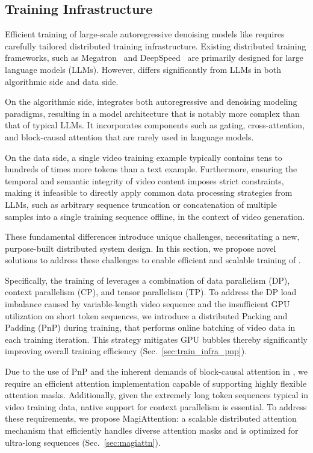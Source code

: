\subsection{Training Infrastructure}




Efficient training of large-scale autoregressive denoising models like \magi requires carefully tailored distributed training infrastructure. Existing distributed training frameworks, such as Megatron~\citep{shoeybi2020megatronlm} and DeepSpeed~\citep{rajbhandari2020zeromemoryoptimizationstraining} are primarily designed for large language models (LLMs). However, \magi differs significantly from LLMs in both algorithmic side and data side.

On the algorithmic side, \magi integrates both autoregressive and denoising modeling paradigms, resulting in a model architecture that is notably more complex than that of typical LLMs. It incorporates components such as gating, cross-attention, and block-causal attention that are rarely used in language models.


On the data side, a single video training example typically contains tens to hundreds of times more tokens than a text example. Furthermore, ensuring the temporal and semantic integrity of video content imposes strict constraints, making it infeasible to directly apply common data processing strategies from LLMs, such as arbitrary sequence truncation or concatenation of multiple samples into a single training sequence offline, in the context of video generation.

These fundamental differences introduce unique challenges, necessitating a new, purpose-built distributed system design. In this section, we propose novel solutions to address these challenges to enable efficient and scalable training of \magi. 


Specifically, the training of \magi leverages a combination of data parallelism (DP), context parallelism (CP), and tensor parallelism (TP). To address the DP load imbalance caused by variable-length video sequence and the insufficient GPU utilization on short token sequences, we introduce a distributed Packing and Padding (PnP) during training, that performs online batching of video data in each training iteration. This strategy mitigates GPU bubbles thereby significantly improving overall training efficiency (Sec.~\ref{sec:train_infra_pnp}).

Due to the use of PnP and the inherent demands of block-causal attention in \magi, we require an efficient attention implementation capable of supporting highly flexible attention masks. Additionally, given the extremely long token sequences typical in video training data, native support for context parallelism is essential. To address these requirements, we propose MagiAttention: a scalable distributed attention mechanism that efficiently handles diverse attention masks and is optimized for ultra-long sequences (Sec.~\ref{sec:magiattn}).

